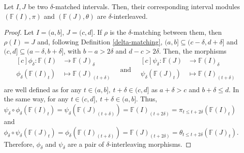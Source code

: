\begin{lemma} \label{interval-interleaving-if-matching} %
    Let $ I, J $ be two $\delta$-matched intervals. Then, their corresponding interval modules $ (\mathbb F (I), \pi) $ and $( \mathbb F (J), \theta) $ are $\delta$-interleaved.
\end{lemma}
\begin{proof}
    Let $ I = (a, b] $, $ J = (c, d] $. If $\rho$ is the $\delta$-matching between them, then $ \rho(I) = J $ and, following Definition \ref{delta-matching}, $ (a, b] \subseteq (c-\delta, d+\delta] $ and $ (c, d] \subseteq (a-\delta, b+\delta] $, with $ b - a > 2\delta $ and $ d - c > 2\delta $. Then, the morphisms
    \begin{equation*}
        \begin{aligned}[c]
        \phi_\delta: \mathbb F(I) &\to \mathbb F(J)_\delta\\
        \phi_\delta(\mathbb F(I)_t) &\mapsto \mathbb F(J)_{(t+\delta)}\\
        \end{aligned}
        \quad \text{and} \quad
        \begin{aligned}[c]
        \psi_\delta: \mathbb F(J) &\to \mathbb F(I)_\delta\\
        \psi_\delta(\mathbb F(J)_t) &\mapsto \mathbb F(I)_{(t+\delta)}\\
        \end{aligned}
    \end{equation*}
    are well defined as for any $ t \in (a,b], \ t + \delta \in (c, d] $ as $ a + \delta > c $ and $ b + \delta \leq d $. In the same way, for any $ t \in (c,d], \ t + \delta \in (a, b] $. Thus, $ \psi_\delta \circ \phi_\delta (\mathbb F(I)_t) = \psi_\delta(\mathbb F(J)_{(t+\delta)}) = \mathbb F(I)_{(t+2\delta)} = \pi_{t \leq t+2\delta}(\mathbb F(I)_t)$ and $ \phi_\delta \circ \psi_\delta (\mathbb F(J)_t) = \phi_\delta(\mathbb F(I)_{(t+\delta)}) = \mathbb F(J)_{(t+2\delta)} = \theta_{t \leq t+2\delta}(\mathbb F(J)_t)$. Therefore, $ \phi_\delta $ and $ \psi_\delta $ are a pair of $\delta$-interleaving morphisms.
\end{proof}

